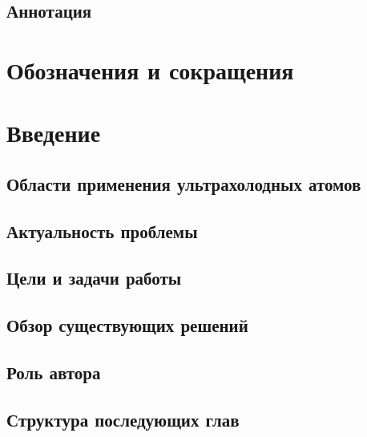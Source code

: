


\newpage
\subsection*{\xmark Аннотация}





\unewpage
\section*{Обозначения и сокращения}




\unewpage
\section{Введение}

\subsection{Области применения ультрахолодных атомов}


\unewpage
\subsection{\xmark Актуальность проблемы}


\unewpage
\subsection{Цели и задачи работы}


\subsection{Обзор существующих решений}


\subsection{Роль автора}

\subsection{Структура последующих глав}








